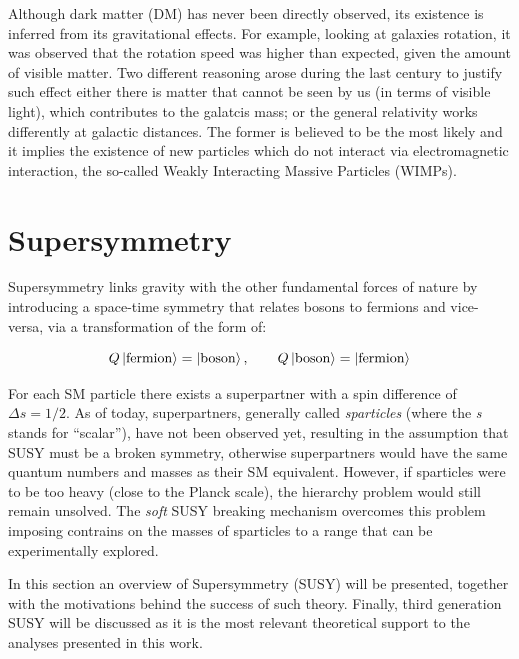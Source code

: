 			Although dark matter (DM) has never been directly observed, its existence is inferred from its gravitational effects. For example, looking at galaxies rotation, it was observed that the rotation speed was higher than expected, given the amount of visible matter. Two different reasoning arose during the last century to justify such effect either there is matter that cannot be seen by us (in terms of visible light), which contributes to the galatcis mass; or the general relativity works differently at galactic distances. The former is believed to be the most likely and it implies the existence of new particles which do not interact via electromagnetic interaction, the so-called Weakly Interacting Massive Particles (WIMPs).





	\section{Supersymmetry}
	\label{sec:SUSY}

		Supersymmetry links gravity with the other fundamental forces of nature by introducing a space-time symmetry that relates bosons to fermions and vice-versa, via a transformation of the form of:  

		\begin{equation}
		\label{eq:susy_transformation}
			Q \ket{\mathrm{fermion}} = \ket{\mathrm{boson}}, \qquad Q \ket{\mathrm{boson}} = \ket{\mathrm{fermion}}
		\end{equation}

		\noindent For each SM particle there exists a superpartner with a spin difference of $\Delta s = 1/2$. As of today, superpartners, generally called \emph{sparticles} (where the \emph{s} stands for ``scalar''), have not been observed yet, resulting in the assumption that SUSY must be a broken symmetry, otherwise superpartners would have the same quantum numbers and masses as their SM equivalent. However, if sparticles were to be too heavy (close to the Planck scale), the hierarchy problem would still remain unsolved. The \emph{soft} SUSY breaking mechanism overcomes this problem imposing contrains on the masses of sparticles to a range that can be experimentally explored. 

		In this section an overview of Supersymmetry (SUSY) will be presented, together with the motivations behind the success of such theory. Finally, third generation SUSY will be discussed as it is the most relevant theoretical support to the analyses presented in this work. 
		
